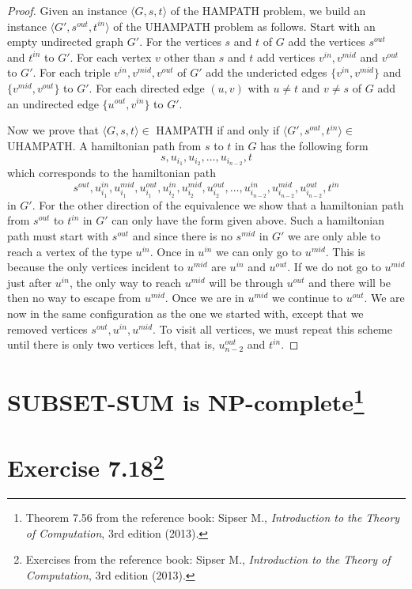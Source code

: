 \documentclass{article}
\begin{document}
\begin{proof}
	Given an instance \(\langle G, s, t \rangle\) of the HAMPATH problem, we
	build an instance \(\langle G', s^{out}, t^{in}\rangle\) of the UHAMPATH
	problem as follows. Start with an empty undirected graph \(G'\). For the
	vertices \(s\) and \(t\) of \(G\) add the vertices \(s^{out}\) and
	\(t^{in}\) to \(G'\). For each vertex \(v\) other than \(s\) and \(t\) add
	vertices \(v^{in}, v^{mid}\) and \(v^{out}\) to \(G'\). For each triple
	\(v^{in},v^{mid},v^{out}\) of \(G'\) add the undericted edges \(\{v^{in},
	v^{mid}\}\) and \(\{v^{mid},v^{out}\}\) to \(G'\).
	For each directed
	edge \((u,v)\) with \(u \neq t\) and \(v \neq s\) of \(G\) add an
	undirected
	edge \(\{u^{out},v^{in}\}\) to \(G'\).

	Now we prove that \(\langle G, s, t \rangle \in\) HAMPATH if and only if
	\(\langle G', s^{out}, t^{in}\rangle \in\) UHAMPATH. A hamiltonian path from \(s\) to
	\(t\) in \(G\) has the following form
	\begin{displaymath}
		s, u_{i_1}, u_{i_2}, \ldots, u_{i_{n-2}}, t
	\end{displaymath}
	which corresponds to the hamiltonian path
	\begin{displaymath}
		s^{out}, u^{in}_{i_1}, u^{mid}_{i_1}, u^{out}_{i_1}, u^{in}_{i_2},
		u^{mid}_{i_2}, u^{out}_{i_2}, \ldots, u^{in}_{i_{n-2}}, u^{mid}_{i_{n-2}},
		u^{out}_{i_{n-2}}, t^{in}
	\end{displaymath}
	in \(G'\). For the other direction of the equivalence we show that a
	hamiltonian path from \(s^{out}\) to \(t^{in}\) in \(G'\) can only have the
	form given above. Such a hamiltonian path must start with \(s^{out}\) and
	since there is no \(s^{mid}\) in \(G'\) we are only able to reach a vertex
	of the type \(u^{in}\). Once in \(u^{in}\) we can only go to \(u^{mid}\).
	This is because the only vertices incident to \(u^{mid}\) are \(u^{in}\) and
	\(u^{out}\). If we do not go to \(u^{mid}\) just after \(u^{in}\),
	the only way to reach \(u^{mid}\) will be through \(u^{out}\) and there
	will be then no way to escape from \(u^{mid}\). Once we are in \(u^{mid}\)
	we continue to \(u^{out}\). We are now in the same configuration as the one
	we started with, except that we removed vertices
	\(s^{out},u^{in},u^{mid}\). To visit all vertices, we must repeat this
	scheme until there is only two vertices left, that is, \(u^{out}_{n-2}\)
	and \(t^{in}\).
\end{proof}

\section{SUBSET-SUM is NP-complete\footnote{%
Theorem 7.56 from the reference book: Sipser M.,
\emph{Introduction to the Theory of Computation}, 3rd edition (2013).}}

\section{Exercise 7.18\footnote{%
Exercises from the reference book: Sipser M.,
\emph{Introduction to the Theory of Computation}, 3rd edition (2013).}}
\end{document}
